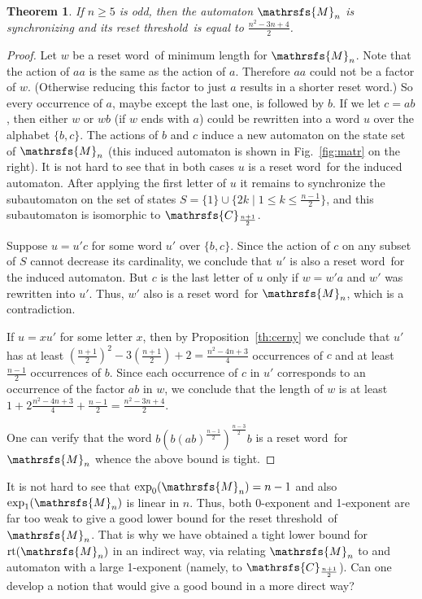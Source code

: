 \documentclass[12pt,twoside]{article}
\newcommand{\sw}{reset word}
\newcommand{\reth}{reset threshold}
\newtheorem{theorem}{Theorem}
\DeclareMathOperator{\rt}{rt}
\begin{document}
\begin{theorem}
\label{th:matr} If $n \geq 5$ is odd, then the automaton $\mathrsfs{M}_n$ is
synchronizing and its \reth\ is equal to $\frac{n^2 -3n + 4}{2}$.
\end{theorem}

\begin{proof}
Let $w$ be a \sw\ of minimum length for $\mathrsfs{M}_n$. Note that the action
of $aa$ is the same as the action of $a$. Therefore $aa$ could not be a factor
of $w$. (Otherwise reducing this factor to just $a$ results in a shorter \sw.)
So every occurrence of $a$, maybe except the last one, is followed by $b$. If
we let $c = ab$, then either $w$ or $wb$ (if $w$ ends with $a$) could be
rewritten into a word $u$ over the alphabet $\{b,c\}$. The actions of $b$ and
$c$ induce a new automaton on the state set of $\mathrsfs{M}_n$ (this induced
automaton is shown in Fig.~\ref{fig:matr} on the right). It is not hard to see
that in both cases $u$ is a \sw\ for the induced automaton. After applying the
first letter of $u$ it remains to synchronize the subautomaton on the set of
states $S =\{1\} \cup \{2k \mid 1 \leq k \leq \frac{n - 1}{2}\}$, and this
subautomaton is isomorphic to $\mathrsfs{C}_{\frac{n + 1}{2}}$.

Suppose $u = u'c$ for some word $u'$ over $\{b,c\}$. Since the action of $c$ on
any subset of $S$ cannot decrease its cardinality, we conclude that $u'$ is
also a \sw\ for the induced automaton. But $c$ is the last letter of $u$ only
if $w = w'a$ and $w'$ was rewritten into $u'$. Thus, $w'$ also is a \sw\ for
$\mathrsfs{M}_n$, which is a contradiction.

If $u = xu'$ for some letter $x$, then by Proposition~\ref{th:cerny} we
conclude that $u'$ has at least $(\frac{n + 1}{2})^2 - 3(\frac{n + 1}{2}) + 2 =
\frac{n^2 - 4n + 3}{4}$ occurrences of $c$ and at least $\frac{n - 1}{2}$
occurrences of $b$. Since each occurrence of $c$ in $u'$ corresponds to an
occurrence of the factor $ab$ in $w$, we conclude that the length of $w$ is at
least $1 + 2\frac{n^2 - 4n + 3}{4} + \frac{n - 1}{2} = \frac{n^2 - 3n + 4}{2}$.

One can verify that the word $b(b(ab)^{\frac{n - 1}{2}})^{\frac{n - 3}{2}}b$ is
a \sw\ for $\mathrsfs{M}_n$ whence the above bound is tight.
\end{proof}

It is not hard to see that $\exp_0(\mathrsfs{M}_n)=n-1$ and also
$\exp_1(\mathrsfs{M}_n)$ is linear in $n$. Thus, both 0-exponent and 1-exponent
are far too weak to give a good lower bound for the \reth\ of $\mathrsfs{M}_n$.
That is why we have obtained a tight lower bound for $\rt(\mathrsfs{M}_n)$ in an
indirect way, via relating $\mathrsfs{M}_n$ to and automaton with a large
1-exponent (namely, to $\mathrsfs{C}_{\frac{n + 1}{2}}$). Can one develop a
notion that would give a good bound in a more direct way?
\end{document}
